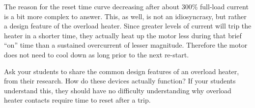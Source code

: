 The reason for the reset time curve decreasing after about 300\% full-load current is a bit more complex to answer.  This, as well, is not an idiosyncrasy, but rather a design feature of the overload heater.  Since greater levels of current will trip the heater in a shorter time, they actually heat up the motor less during that brief ``on'' time than a sustained overcurrent of lesser magnitude.  Therefore the motor does not need to cool down as long prior to the next re-start.  







Ask your students to share the common design features of an overload heater, from their research.  How do these devices actually function?  If your students understand this, they should have no difficulty understanding why overload heater contacts require time to reset after a trip.




